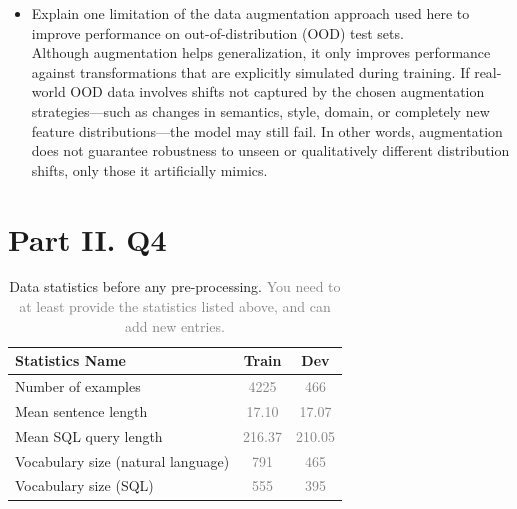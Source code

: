 \documentclass{article}
\begin{document}
\begin{itemize}
        Data augmentation increases the diversity of training samples by introducing controlled transformations. This helps the model avoid memorizing specific patterns in the training set and instead learn more generalizable decision boundaries. As a result, the model becomes more robust to variations that appear during testing, especially when inputs differ from the original training distribution (e.g., modified, noisy, or transformed data).\\
        
        
        \item Explain one limitation of the data augmentation approach used here to improve performance on out-of-distribution (OOD) test sets. \\

        Although augmentation helps generalization, it only improves performance against transformations that are explicitly simulated during training. If real-world OOD data involves shifts not captured by the chosen augmentation strategies—such as changes in semantics, style, domain, or completely new feature distributions—the model may still fail. In other words, augmentation does not guarantee robustness to unseen or qualitatively different distribution shifts, only those it artificially mimics.
    \end{itemize}

\newpage
\section*{Part II. Q4}
% 


\begin{table}[h!]
\centering
\begin{tabular}{lcc}
\toprule
Statistics Name & Train & Dev \\
\midrule
Number of examples & \textcolor{gray}{4225} & \textcolor{gray}{466} \\
Mean sentence length & \textcolor{gray}{17.10}& \textcolor{gray}{17.07} \\
Mean SQL query length & \textcolor{gray}{216.37}& \textcolor{gray}{210.05}  \\
Vocabulary size (natural language)& \textcolor{gray}{791}& \textcolor{gray}{465}  \\
Vocabulary size (SQL)& \textcolor{gray}{555}& \textcolor{gray}{395}  \\
\bottomrule
\end{tabular}
\caption{Data statistics before any pre-processing. \textcolor{gray}{You need to at least provide the statistics listed above, and can add new entries.}}
\label{tab:data_stats_before}
\end{table}
\end{document}

